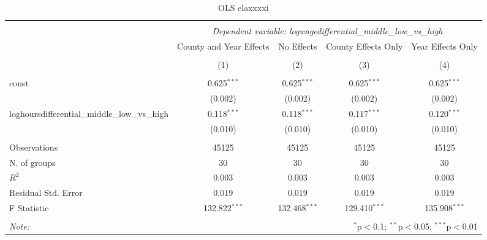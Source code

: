 \documentclass{report}
\begin{document}
\begin{table}[!htbp] \centering
  \caption{OLS elaxxxxi}
\begin{tabular}{@{\extracolsep{5pt}}lcccc}
\\[-1.8ex]\hline
\hline \\[-1.8ex]
& \multicolumn{4}{c}{\textit{Dependent variable: logwagedifferential_middle_low_vs_high}} \
\cr \cline{2-5}
\\[-1.8ex] & \multicolumn{1}{c}{County and Year Effects} & \multicolumn{1}{c}{No Effects} & \multicolumn{1}{c}{County Effects Only} & \multicolumn{1}{c}{Year Effects Only}  \\
\\[-1.8ex] & (1) & (2) & (3) & (4) \\
\hline \\[-1.8ex]
 const & 0.625$^{***}$ & 0.625$^{***}$ & 0.625$^{***}$ & 0.625$^{***}$ \\
& (0.002) & (0.002) & (0.002) & (0.002) \\
 loghoursdifferential_middle_low_vs_high & 0.118$^{***}$ & 0.118$^{***}$ & 0.117$^{***}$ & 0.120$^{***}$ \\
& (0.010) & (0.010) & (0.010) & (0.010) \\
\hline \\[-1.8ex]
 Observations & 45125 & 45125 & 45125 & 45125 \\
 N. of groups & 30 & 30 & 30 & 30 \\
 $R^2$ & 0.003 & 0.003 & 0.003 & 0.003 \\
 Residual Std. Error & 0.019 & 0.019 & 0.019 & 0.019 \\
 F Statistic & 132.822$^{***}$ & 132.468$^{***}$ & 129.410$^{***}$ & 135.908$^{***}$ \\
\hline
\hline \\[-1.8ex]
\textit{Note:} & \multicolumn{4}{r}{$^{*}$p$<$0.1; $^{**}$p$<$0.05; $^{***}$p$<$0.01} \\
\end{tabular}
\end{table}
\end{document}
